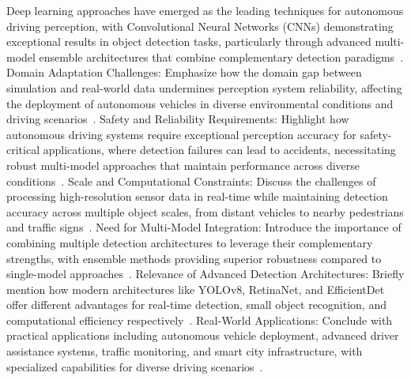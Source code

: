 \documentclass[conference]{IEEEtran}
\begin{document}
Deep learning approaches have emerged as the leading techniques for autonomous driving perception, with Convolutional Neural Networks (CNNs) demonstrating exceptional results in object detection tasks, particularly through advanced multi-model ensemble architectures that combine complementary detection paradigms~\cite{zhao2024temporal}.
Domain Adaptation Challenges: Emphasize how the domain gap between simulation and real-world data undermines perception system reliability, affecting the deployment of autonomous vehicles in diverse environmental conditions and driving scenarios~\cite{rodriguez2025temporal}.
Safety and Reliability Requirements: Highlight how autonomous driving systems require exceptional perception accuracy for safety-critical applications, where detection failures can lead to accidents, necessitating robust multi-model approaches that maintain performance across diverse conditions~\cite{shaaban2025audio}.
Scale and Computational Constraints: Discuss the challenges of processing high-resolution sensor data in real-time while maintaining detection accuracy across multiple object scales, from distant vehicles to nearby pedestrians and traffic signs~\cite{balafrej2024enhancing}.
Need for Multi-Model Integration: Introduce the importance of combining multiple detection architectures to leverage their complementary strengths, with ensemble methods providing superior robustness compared to single-model approaches~\cite{chen2024neural}.
Relevance of Advanced Detection Architectures: Briefly mention how modern architectures like YOLOv8, RetinaNet, and EfficientDet offer different advantages for real-time detection, small object recognition, and computational efficiency respectively~\cite{wang2024efficient}.
Real-World Applications: Conclude with practical applications including autonomous vehicle deployment, advanced driver assistance systems, traffic monitoring, and smart city infrastructure, with specialized capabilities for diverse driving scenarios~\cite{ahmad2024fame}.
\end{document}
